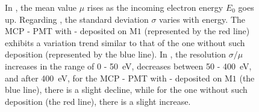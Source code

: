 \begin{figure}[!ht]
\begin{subfigure}[b]{0.5\textwidth}
		\caption{}
		\label{fig:sigmamu}
	\end{subfigure}
	\caption{In , the mean value \(\mu\) rises as the incoming electron energy \(E_0\) goes up. Regarding , the standard deviation \(\sigma\) varies with energy. The MCP - PMT with - deposited on \(\mathrm{M}1\) (represented by the red line) exhibits a variation trend similar to that of the one without such deposition (represented by the blue line). In , the resolution \(\sigma/\mu\) increases in the range of 0 - \SI{50}{eV}, decreases between 50 - \SI{400}{eV}, and after \SI{400}{eV}, for the MCP - PMT with - deposited on \(\mathrm{M}1\) (the blue line), there is a slight decline, while for the one without such deposition (the red line), there is a slight increase.
	}
	\label{fig:gaintest}
\end{figure}

